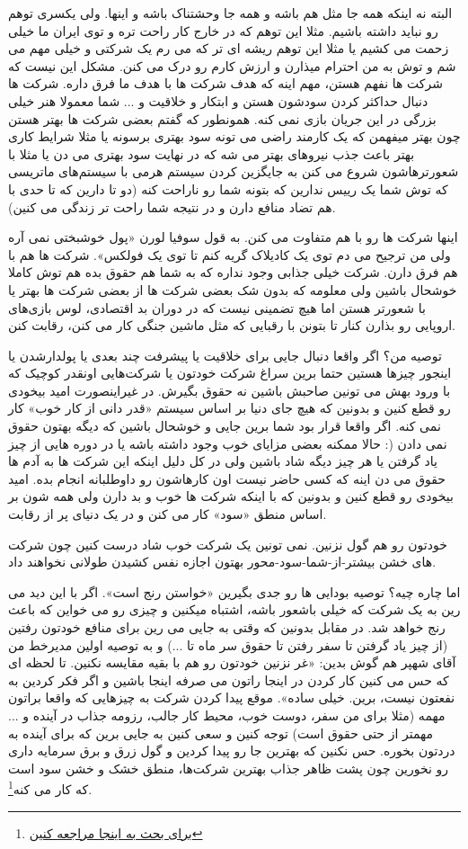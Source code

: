 البته نه اینکه همه جا مثل هم باشه و همه جا وحشتناک باشه و اینها. ولی یکسری توهم رو نباید داشته باشیم. مثلا این توهم که در خارج کار راحت تره و توی ایران ما خیلی زحمت می کشیم یا مثلا این توهم ریشه ای تر که می رم یک شرکتی و خیلی مهم می شم و توش به من احترام میذارن و ارزش کارم رو درک می کنن. مشکل این نیست که شرکت ها نفهم هستن، مهم اینه که هدف شرکت ها با هدف ما فرق داره. شرکت ها دنبال حداکثر کردن سودشون هستن و ابتکار و خلاقیت و ... شما معمولا هنر خیلی بزرگی در این جریان بازی نمی کنه. همونطور که گفتم بعضی شرکت ها بهتر هستن چون بهتر میفهمن که یک کارمند راضی می تونه سود بهتری برسونه یا مثلا شرایط کاری بهتر باعث جذب نیروهای بهتر می شه که در نهایت سود بهتری می دن یا مثلا با شعورترهاشون شروع می کنن به جایگزین کردن سیستم هرمی با سیستم‌های ماتریسی که توش شما یک رییس ندارین که بتونه شما رو ناراحت کنه (دو تا دارین که تا حدی با هم تضاد منافع دارن و در نتیجه شما راحت تر زندگی می کنین).

اینها شرکت ها رو با هم متفاوت می کنن. به قول سوفیا لورن «پول خوشبختی نمی آره ولی من ترجیح می دم توی یک کادیلاک گریه کنم تا توی یک فولکس». شرکت ها هم با هم فرق دارن. شرکت خیلی جذابی وجود نداره که به شما هم حقوق بده هم توش کاملا خوشحال باشین ولی معلومه که بدون شک بعضی شرکت ها از بعضی شرکت ها بهتر یا با شعورتر هستن اما هیچ تضمینی نیست که در دوران بد اقتصادی، لوس بازی‌های اروپایی رو بذارن کنار تا بتونن با رقبایی که مثل ماشین جنگی کار می کنن، رقابت کنن.

توصیه من؟ اگر واقعا دنبال جایی برای خلاقیت یا پیشرفت چند بعدی یا پولدارشدن یا اینجور چیزها هستین حتما برین سراغ شرکت خودتون یا شرکت‌هایی اونقدر کوچیک که با ورود بهش می تونین صاحبش باشین نه حقوق بگیرش. در غیراینصورت امید بیخودی رو قطع کنین و بدونین که هیچ جای دنیا بر اساس سیستم «قدر دانی از کار خوب»‌ کار نمی کنه. اگر واقعا قرار بود شما برین جایی و خوشحال باشین که دیگه بهتون حقوق نمی دادن (: حالا ممکنه بعضی مزایای خوب وجود داشته باشه یا در دوره هایی از چیز یاد گرفتن یا هر چیز دیگه شاد باشین ولی در کل دلیل اینکه این شرکت ها به آدم ها حقوق می دن اینه که کسی حاضر نیست اون کارهاشون رو داوطلبانه انجام بده. امید بیخودی رو قطع کنین و بدونین که با اینکه شرکت ها خوب و بد دارن ولی همه شون بر اساس منطق «سود»‌ کار می کنن و در یک دنیای پر از رقابت.

خودتون رو هم گول نزنین. نمی تونین یک شرکت خوب شاد درست کنین چون شرکت های خشن بیشتر-از-شما-سود-محور بهتون اجازه نفس کشیدن طولانی نخواهند داد.

اما چاره چیه؟ توصیه بودایی ها رو جدی بگیرین «خواستن رنج است». اگر با این دید می رین به یک شرکت که خیلی باشعور باشه، اشتباه میکنین و چیزی رو می خواین که باعث رنج خواهد شد. در مقابل بدونین که وقتی به جایی می رین برای منافع خودتون رفتین (از چیز یاد گرفتن تا سفر رفتن تا حقوق سر ماه تا ...) و به توصیه اولین مدیرخط من آقای شهپر هم گوش بدین: «غر نزنین خودتون رو هم با بقیه مقایسه نکنین. تا لحظه ای که حس می کنین کار کردن در اینجا راتون می صرفه اینجا باشین و اگر فکر کردین به نفعتون نیست، برین. خیلی ساده». موقع پیدا کردن شرکت به چیزهایی که واقعا براتون مهمه (مثلا برای من سفر، دوست خوب، محیط کار جالب، رزومه جذاب در آینده و ... مهمتر از حتی حقوق است) توجه کنین و سعی کنین به جایی برین که برای آینده به دردتون بخوره. حس نکنین که بهترین جا رو پیدا کردین و گول زرق و برق سرمایه داری رو نخورین چون پشت ظاهر جذاب بهترین شرکت‌ها، منطق خشک و خشن سود است که کار می کنه\footnote{\href{http://jadi.net2012/08/sherkate-khoob-ham-darim/)}{برای بحث به اینجا مراجعه کنین}}.
